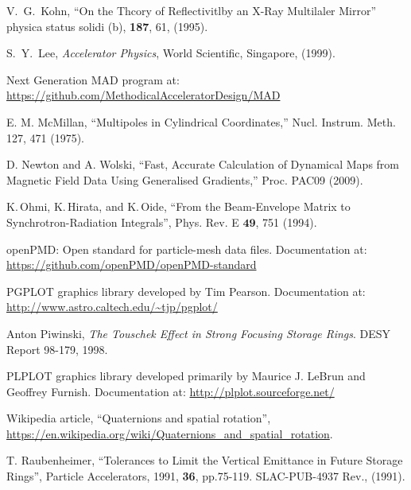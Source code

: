 \begin{thebibliography}{XXXXXXX99}
V.~G.~Kohn, 
``On the Thcory of Reflectivitlby an X-Ray Multilaler Mirror''
physica status solidi (b), {\bf 187}, 61, (1995).

S.~Y.~Lee,
{\it Accelerator Physics},
World Scientific, Singapore, (1999).

Next Generation MAD program at:
\hfill\break
\hspace*{0.3in}
\url{https://github.com/MethodicalAcceleratorDesign/MAD}

E. M. McMillan, 
``Multipoles in Cylindrical Coordinates,''
Nucl. Instrum. Meth. 127, 471 (1975).

D. Newton and A. Wolski, 
``Fast, Accurate Calculation of Dynamical Maps from
Magnetic Field Data Using Generalised Gradients,''
Proc. PAC09 (2009).

K.\,Ohmi, K.\,Hirata, and K.\,Oide,
``From the Beam-Envelope Matrix to Synchrotron-Radiation Integrals'',
Phys. Rev. E $\mathbf{49}$, 751 (1994).

openPMD: Open standard for particle-mesh data files. Documentation at:
\hfill\break
\hspace*{0.3in}
\url{https://github.com/openPMD/openPMD-standard}

PGPLOT graphics library developed by Tim Pearson. Documentation at:
\hfill\break
\hspace*{0.3in}
\url{http://www.astro.caltech.edu/~tjp/pgplot/}

Anton Piwinski, \emph{The Touschek Effect in Strong Focusing Storage Rings}.
DESY Report 98-179, 1998.

PLPLOT graphics library developed primarily by Maurice J. LeBrun and Geoffrey Furnish. Documentation at:
\hfill\break
\hspace*{0.3in}
\url{http://plplot.sourceforge.net/}

Wikipedia article, ``Quaternions and spatial rotation'',
\hfill\break
\hspace*{20pt} 
\url{https://en.wikipedia.org/wiki/Quaternions_and_spatial_rotation}.

T. Raubenheimer,
``Tolerances to Limit the Vertical Emittance in Future Storage Rings'', 
Particle Accelerators, 1991, {\bf 36}, pp.75-119. 
SLAC-PUB-4937 Rev., (1991).


\end{thebibliography}
